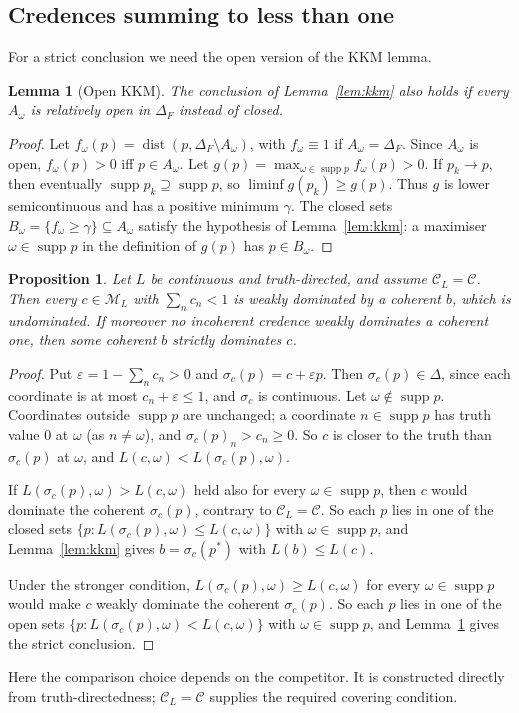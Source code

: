 \documentclass[11pt]{article}
\newtheorem{lemma}[theorem]{Lemma}
\newtheorem{proposition}[theorem]{Proposition}
\theoremstyle{definition}
\theoremstyle{remark}
\newcommand{\M}{\mathcal M}
\newcommand{\C}{\mathcal C}
\newcommand{\supp}{\operatorname{supp}}
\begin{document}
\subsection{Credences summing to less than one}
For a strict conclusion we need the open version of the KKM lemma.
\begin{lemma}[Open KKM]\label{lem:openkkm}
The conclusion of Lemma~\ref{lem:kkm} also holds if every $A_\omega$ is relatively open in $\Delta_F$ instead of closed.
\end{lemma}
\begin{proof}
Let $f_\omega(p)=\operatorname{dist}(p,\Delta_F\setminus A_\omega)$, with $f_\omega\equiv1$ if $A_\omega=\Delta_F$. Since $A_\omega$ is open, $f_\omega(p)>0$ iff $p\in A_\omega$. Let $g(p)=\max_{\omega\in\supp p}f_\omega(p)>0$. If $p_k\to p$, then eventually $\supp p_k\supseteq\supp p$, so $\liminf g(p_k)\ge g(p)$. Thus $g$ is lower semicontinuous and has a positive minimum $\gamma$. The closed sets $B_\omega=\{f_\omega\ge\gamma\}\subseteq A_\omega$ satisfy the hypothesis of Lemma~\ref{lem:kkm}: a maximiser $\omega\in\supp p$ in the definition of $g(p)$ has $p\in B_\omega$.
\end{proof}

\begin{proposition}\label{prop:joyce-sub}
Let $L$ be continuous and truth-directed, and assume $\C_L=\C$. Then every $c\in\M_L$ with $\sum_nc_n<1$ is weakly dominated by a coherent $b$, which is undominated. If moreover no incoherent credence weakly dominates a coherent one, then some coherent $b$ strictly dominates $c$.
\end{proposition}
\begin{proof}
Put $\varepsilon=1-\sum_nc_n>0$ and $\sigma_c(p)=c+\varepsilon p$. Then $\sigma_c(p)\in\Delta$, since each coordinate is at most $c_n+\varepsilon\le1$, and $\sigma_c$ is continuous. Let $\omega\notin\supp p$. Coordinates outside $\supp p$ are unchanged; a coordinate $n\in\supp p$ has truth value $0$ at $\omega$ (as $n\ne\omega$), and $\sigma_c(p)_n>c_n\ge0$. So $c$ is closer to the truth than $\sigma_c(p)$ at $\omega$, and $L(c,\omega)<L(\sigma_c(p),\omega)$.

If $L(\sigma_c(p),\omega)>L(c,\omega)$ held also for every $\omega\in\supp p$, then $c$ would dominate the coherent $\sigma_c(p)$, contrary to $\C_L=\C$. So each $p$ lies in one of the closed sets $\{p:L(\sigma_c(p),\omega)\le L(c,\omega)\}$ with $\omega\in\supp p$, and Lemma~\ref{lem:kkm} gives $b=\sigma_c(p^*)$ with $L(b)\le L(c)$.

Under the stronger condition, $L(\sigma_c(p),\omega)\ge L(c,\omega)$ for every $\omega\in\supp p$ would make $c$ weakly dominate the coherent $\sigma_c(p)$. So each $p$ lies in one of the open sets $\{p:L(\sigma_c(p),\omega)<L(c,\omega)\}$ with $\omega\in\supp p$, and Lemma~\ref{lem:openkkm} gives the strict conclusion.
\end{proof}
Here the comparison choice depends on the competitor. It is constructed directly from truth-directedness; $\C_L=\C$ supplies the required covering condition.
\end{document}
